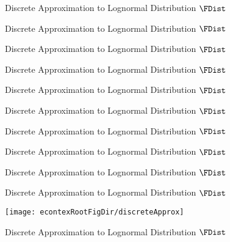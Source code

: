 \begin{figure}
        \caption{Discrete Approximation to Lognormal Distribution $\FDist$}
        \label{fig:discreteapprox}
\end{figure}
\begin{figure}
        \caption{Discrete Approximation to Lognormal Distribution $\FDist$}
        \label{fig:discreteapprox}
\end{figure}
\begin{figure}
        \caption{Discrete Approximation to Lognormal Distribution $\FDist$}
        \label{fig:discreteapprox}
\end{figure}
\begin{figure}
        \caption{Discrete Approximation to Lognormal Distribution $\FDist$}
        \label{fig:discreteapprox}
\end{figure}
\begin{figure}
        \caption{Discrete Approximation to Lognormal Distribution $\FDist$}
        \label{fig:discreteapprox}
\end{figure}
\begin{figure}
        \caption{Discrete Approximation to Lognormal Distribution $\FDist$}
        \label{fig:discreteapprox}
\end{figure}
\begin{figure}
        \caption{Discrete Approximation to Lognormal Distribution $\FDist$}
        \label{fig:discreteapprox}
\end{figure}
\begin{figure}
        \caption{Discrete Approximation to Lognormal Distribution $\FDist$}
        \label{fig:discreteapprox}
\end{figure}
\begin{figure}
        \caption{Discrete Approximation to Lognormal Distribution $\FDist$}
        \label{fig:discreteapprox}
\end{figure}
\begin{figure}
        \caption{Discrete Approximation to Lognormal Distribution $\FDist$}
        \label{fig:discreteapprox}
\end{figure}
\begin{figure}
        \texttt{[image: econtexRootFigDir/discreteApprox]}
        \caption{Discrete Approximation to Lognormal Distribution $\FDist$}
        \label{fig:discreteapprox}
\end{figure}
